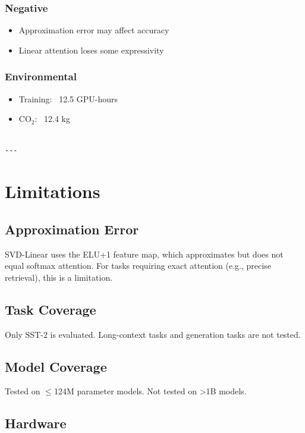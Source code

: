 \subsubsection{Negative}
\begin{itemize}
\item Approximation error may affect accuracy
\item Linear attention loses some expressivity

\end{itemize}
\subsubsection{Environmental}
\begin{itemize}
\item Training: ~12.5 GPU-hours
\item CO$_2$: ~12.4 kg
\end{itemize}
\begin{lstlisting}

---
\end{lstlisting}


\section{Limitations}

\subsection{Approximation Error}

SVD-Linear uses the ELU+1 feature map, which approximates but does not equal 
softmax attention. For tasks requiring exact attention (e.g., precise 
retrieval), this is a limitation.

\subsection{Task Coverage}

Only SST-2 is evaluated. Long-context tasks and generation tasks are not 
tested.

\subsection{Model Coverage}

Tested on $\le$124M parameter models. Not tested on >1B models.

\subsection{Hardware}

